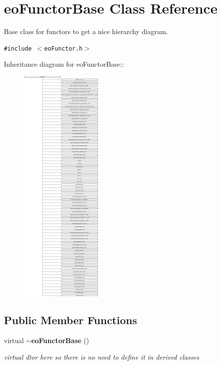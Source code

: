 \section{eo\-Functor\-Base Class Reference}
\label{classeo_functor_base}
Base class for functors to get a nice hierarchy diagram.  


{\tt \#include $<$eo\-Functor.h$>$}

Inheritance diagram for eo\-Functor\-Base::\begin{figure}[H]
\begin{center}
\leavevmode
\includegraphics[height=12cm]{classeo_functor_base}
\end{center}
\end{figure}
\subsection*{Public Member Functions}
\begin{CompactItemize}
\item 
virtual {\bf $\sim$eo\-Functor\-Base} ()\label{classeo_functor_base_a0}

\begin{CompactList}\small\item\em virtual dtor here so there is no need to define it in derived classes \item\end{CompactList}\end{CompactItemize}



